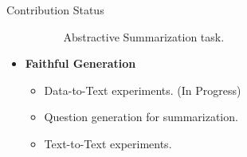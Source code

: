 \begin{frame}{Contribution Status}
\begin{itemize}
\begin{itemize}
\begin{itemize}
                        {\color{purple} Abstractive Summarization} task.
                \end{itemize}
        \end{itemize}
    \item \textbf{Faithful Generation}
        \begin{itemize}
            \item[\color{red}\ding{55}] Data-to-Text experiments. (In Progress)
            \item[\color{red}\ding{55}] Question generation for summarization.
            \item[\color{red}\ding{55}] Text-to-Text experiments.
        \end{itemize}
\end{itemize}



\end{frame}

